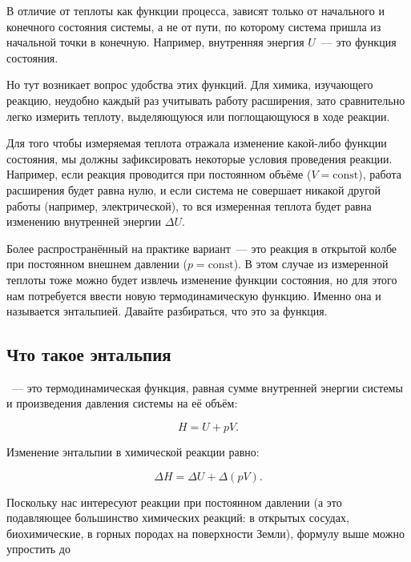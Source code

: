 В отличие от теплоты как функции процесса,  зависят только от начального и конечного состояния системы, а не от пути, по которому система пришла из начальной точки в конечную. Например, внутренняя энергия $U$~--- это функция состояния.

Но тут возникает вопрос удобства этих функций. Для химика, изучающего реакцию, неудобно каждый раз учитывать работу расширения, зато сравнительно легко измерить теплоту, выделяющуюся или поглощающуюся в ходе реакции.

Для того чтобы измеряемая теплота отражала изменение какой-либо функции состояния, мы должны зафиксировать некоторые условия проведения реакции. Например, если реакция проводится при постоянном объёме ($V = \mathrm{const}$), работа расширения будет равна нулю, и если система не совершает никакой другой работы (например, электрической), то вся измеренная теплота будет равна изменению внутренней энергии $\Delta{}U$.

Более распространённый на практике вариант~--- это реакция в открытой колбе при постоянном внешнем давлении ($p = \mathrm{const}$). В этом случае из измеренной теплоты тоже можно будет извлечь изменение функции состояния, но для этого нам потребуется ввести новую термодинамическую функцию. Именно она и называется энтальпией. Давайте разбираться, что это за функция.

\subsection*{Что такое энтальпия}

~--- это термодинамическая функция, равная сумме внутренней энергии системы и произведения давления системы на её объём:

\begin{equation*}
    H = U + pV.
\end{equation*}

Изменение энтальпии в химической реакции равно:

\begin{equation*}
    \Delta{}H = \Delta{}U + \Delta{}(pV).
\end{equation*}

Поскольку нас интересуют реакции при постоянном давлении (а это подавляющее большинство химических реакций: в открытых сосудах, биохимические, в горных породах на поверхности Земли), формулу выше можно упростить до

